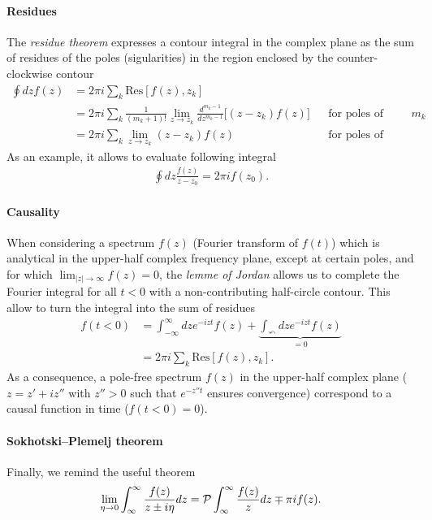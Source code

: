 \documentclass[notitlepage,11pt,nofootinbib]{revtex4-1}
\begin{document}
\paragraph*{Residues} The \emph{residue theorem} expresses a contour integral in the complex plane as the sum of residues of the poles (sigularities) in the region enclosed by the counter-clockwise contour
\begin{align}
\oint dz f(z) 
&= 
2\pi i \sum_{k}\text{Res}[f(z),z_k]
\label{residue}
\\
&=
2\pi i \sum_{k}
\frac{1}{(m_k+1)!}
\lim_{z\rightarrow z_k}
\frac{d^{{m_k-1}}}{dz^{m_k-1}}
\Big[(z-z_k)f(z)\Big]
\label{residue_order_m}
&&\text{for poles of order $m_k$}
\\
&=
2\pi i \sum_{k}
\lim_{z\rightarrow z_k}
(z-z_k)f(z)
\label{residue_order_1}
&&\text{for poles of order 1}
\end{align}
As an example, it allows to evaluate following integral
\begin{align}
\oint dz \frac{f(z)}{z-z_0} = 2\pi i f(z_{0}).
\label{simplest_residue}
\end{align}

\paragraph*{Causality} When considering a spectrum $f(z)$ (Fourier transform of $f(t)$) which is analytical in the upper-half complex frequency plane, except at certain poles, and for which $\lim_{|z|\rightarrow\infty} f(z) = 0$, the \emph{lemme of Jordan} allows us to complete the Fourier integral for all $t<0$ with a non-contributing half-circle contour. This allow to turn the integral into the sum of residues
\begin{align}
f(t<0)
&=
\int_{-\infty}^{\infty} dz e^{-iz t} f(z)
+ \underbrace{
\int_{\curvearrowleft} dz e^{-iz t}f(z)
}_{=0}
\label{causal1}
\\&= 
2\pi i \sum_{k}\text{Res}[f(z),z_k].
\label{causal2}
\end{align}
As a consequence, a pole-free spectrum $f(z)$ in the upper-half complex plane ($z=z'+iz''$ with $z''>0$ such that $e^{-z''t}$ ensures convergence) correspond to a causal function in time ($f(t<0)=0$).

\paragraph*{Sokhotski–Plemelj theorem} Finally, we remind the useful theorem
\begin{align}
\lim_{\eta\rightarrow 0}\int_{\-\infty}^{\infty} \frac{f(z)}{z \pm i\eta} dz
=  
\mathcal P \int_{\-\infty}^{\infty} \frac{f(z)}{z} dz \mp \pi i f(z).
\label{Sokhotski_Plemelj}
\end{align}
\end{document}
